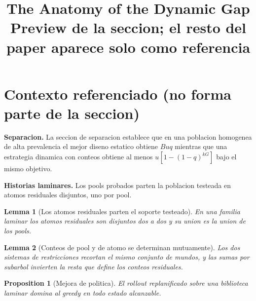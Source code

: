 \documentclass[11pt]{article}
\title{\textbf{The Anatomy of the Dynamic Gap}\\
\large Preview de la seccion; el resto del paper aparece solo como referencia}
\author{}
\date{}
\newtheorem{proposition}{Proposition}
\newtheorem{lemma}{Lemma}
\begin{document}
\maketitle

\section*{Contexto referenciado (no forma parte de la seccion)}

\label{sec:separation}
\noindent\textbf{Separacion.} La seccion de separacion establece que en una
poblacion homogenea de alta prevalencia el mejor diseno estatico obtiene $Buq$
mientras que una estrategia dinamica con conteos obtiene al menos
$u[1-(1-q)^{kG}]$ bajo el mismo objetivo.

\label{sec:laminar-pools}
\noindent\textbf{Historias laminares.} Los pools probados parten la poblacion
testeada en atomos residuales disjuntos, uno por pool.

\begin{lemma}[Los atomos residuales parten el soporte testeado]
\label{lem:atomic-partition}
En una familia laminar los atomos residuales son disjuntos dos a dos y su union
es la union de los pools.
\end{lemma}

\begin{lemma}[Conteos de pool y de atomo se determinan mutuamente]
\label{lem:count-equivalence}
Los dos sistemas de restricciones recortan el mismo conjunto de mundos, y las
sumas por subarbol invierten la resta que define los conteos residuales.
\end{lemma}

\begin{proposition}[Mejora de politica]
\label{prop:policy-improvement}
El rollout replanificado sobre una biblioteca laminar domina al greedy en todo
estado alcanzable.
\end{proposition}

\clearpage

\end{document}
